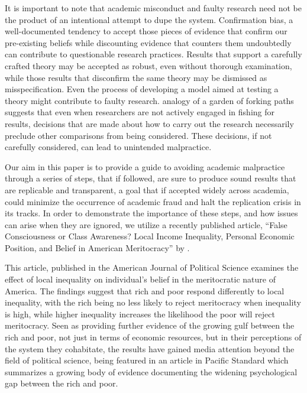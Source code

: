 It is important to note that academic misconduct and faulty research need not be the product of an intentional attempt to dupe the system. Confirmation bias, a well-documented tendency to accept those pieces of evidence that confirm our pre-existing beliefs while discounting evidence that counters them undoubtedly can contribute to questionable research practices. Results that support a carefully crafted theory may be accepted as robust, even without thorough examination, while those results that disconfirm the same theory may be dismissed as misspecification. Even the process of developing a model aimed at testing a theory might contribute to faulty research. \citet{Gelman2013garden} analogy of a garden of forking paths suggests that even when researchers are not actively engaged in fishing for results, decisions that are made about how to carry out the research necessarily preclude other comparisons from being considered. These decisions, if not carefully considered, can lead to unintended malpractice.

Our aim in this paper is to provide a guide to avoiding academic malpractice through a series of steps, that if followed, are sure to produce sound results that are replicable and transparent, a goal that if accepted widely across academia, could minimize the occurrence of academic fraud and halt the replication crisis in its tracks. In order to demonstrate the importance of these steps, and how issues can arise when they are ignored, we utilize a recently published article, “False Consciousness or Class Awareness? Local Income Inequality, Personal Economic Position, and Belief in American Meritocracy” by \citet{Newman2015}.

This article, published in the American Journal of Political Science examines the effect of local inequality on individual’s belief in the meritocratic nature of America. The findings suggest that rich and poor respond differently to local inequality, with the rich being no less likely to reject meritocracy when inequality is high, while higher inequality increases the likelihood the poor will reject meritocracy. Seen as providing further evidence of the growing gulf between the rich and poor, not just in terms of economic resources, but in their perceptions of the system they cohabitate, the results have gained media attention beyond the field of political science, being featured in an article in Pacific Standard which summarizes a growing body of evidence documenting the widening psychological gap between the rich and poor.

